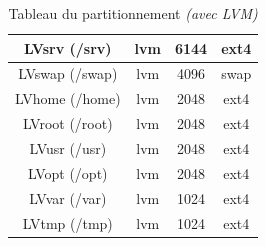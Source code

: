 \begin{center}
    \begin{table}[h]
    \begin{tabularx}{\linewidth}{|C|C|C|C|}
        \hline
        LVsrv (/srv) & lvm & 6144 & ext4 \\
        \hline
        LVswap (/swap) & lvm & 4096 & swap \\
        \hline
        LVhome (/home) & lvm & 2048 & ext4 \\
        \hline
        LVroot (/root) & lvm & 2048 & ext4 \\
        \hline
        LVusr (/usr) & lvm & 2048 & ext4 \\
        \hline
        LVopt (/opt) & lvm & 2048 & ext4 \\
        \hline
        LVvar (/var) & lvm & 1024 & ext4 \\
        \hline
        LVtmp (/tmp) & lvm & 1024 & ext4 \\
        \hline
    \end{tabularx}
    \caption{Tableau du partitionnement \textit{(avec LVM)}}
    \label{tab:tableau-partitionnement}
\end{table}
\end{center}

